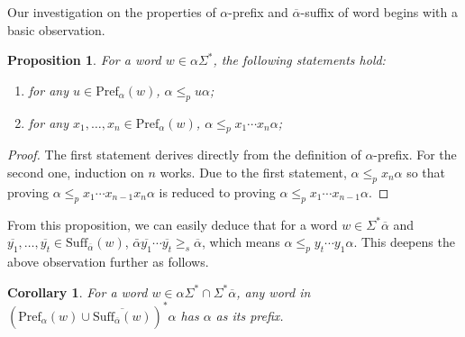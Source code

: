 \documentclass{article}
\theoremstyle{plain}
\newtheorem{proposition}{Proposition}
\newtheorem{corollary}{Corollary}
\theoremstyle{remark}
\newcommand{\Pref}{\ensuremath{\mathrm{Pref}}}
\newcommand{\Suff}{\ensuremath{\mathrm{Suff}}}
\newcommand{\calpha}{\ensuremath{\overline{\alpha}}}
\begin{document}
Our investigation on the properties of $\alpha$-prefix and $\calpha$-suffix of word begins with a basic observation. 

\begin{proposition}\label{prop:aprefix_basic}
	For a word $w \in \alpha \Sigma^*$, the following statements hold: 
	\begin{enumerate}
	\item	for any $u \in \Pref_\alpha(w)$, $\alpha \le_p u\alpha$; 
	\item	for any $x_1, \ldots, x_n \in \Pref_\alpha(w)$, $\alpha \le_p x_1 \cdots x_n \alpha$; 
\end{enumerate}
\end{proposition}
\begin{proof}
	The first statement derives directly from the definition of $\alpha$-prefix. 
	For the second one, induction on $n$ works. 
	Due to the first statement, $\alpha \le_p x_n \alpha$ so that proving $\alpha \le_p x_1 \cdots x_{n-1} x_n \alpha$ is reduced to proving $\alpha \le_p x_1 \cdots x_{n-1} \alpha$. 
\end{proof}

From this proposition, we can easily deduce that for a word $w \in \Sigma^* \overline{\alpha}$ and $\overline{y_1}, \ldots, \overline{y_t} \in \Suff_{\overline{\alpha}}(w)$, $\bar{\alpha} \overline{y_1} \cdots \overline{y_t} \ge_s \overline{\alpha}$, which means $\alpha \le_p y_t \cdots y_1 \alpha$. 
This deepens the above observation further as follows. 

\begin{corollary}\label{cor:apref_casuff_transitive}
	For a word $w \in \alpha \Sigma^* \cap \Sigma^* \overline{\alpha}$, any word in $(\Pref_\alpha(w) \cup \overline{\Suff_{\overline{\alpha}}(w)})^* \alpha$ has $\alpha$ as its prefix. 
\end{corollary}
\end{document}

